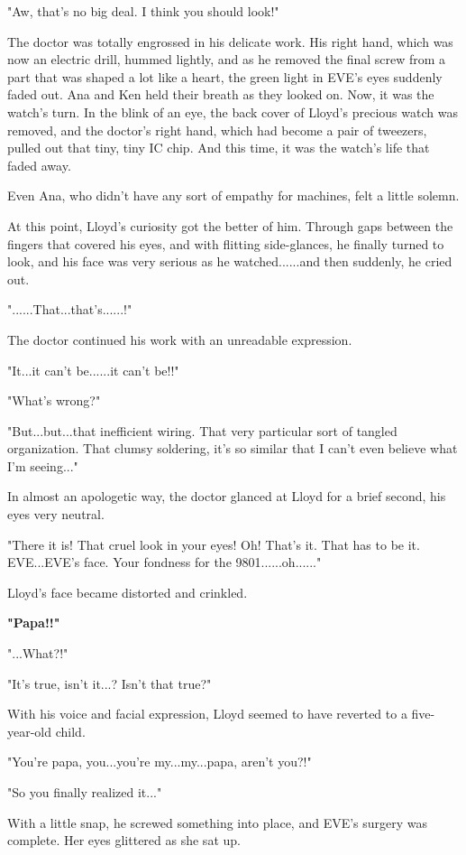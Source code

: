 \documentclass[
]{article}
\begin{document}
"Aw, that's no big deal. I think you should look!"

The doctor was totally engrossed in his delicate work. His right hand,
which was now an electric drill, hummed lightly, and as he removed the
final screw from a part that was shaped a lot like a heart, the green
light in EVE's eyes suddenly faded out. Ana and Ken held their breath as
they looked on. Now, it was the watch's turn. In the blink of an eye,
the back cover of Lloyd's precious watch was removed, and the doctor's
right hand, which had become a pair of tweezers, pulled out that tiny,
tiny IC chip. And this time, it was the watch's life that faded away.

Even Ana, who didn't have any sort of empathy for machines, felt a
little solemn.

At this point, Lloyd's curiosity got the better of him. Through gaps
between the fingers that covered his eyes, and with flitting
side-glances, he finally turned to look, and his face was very serious
as he watched......and then suddenly, he cried out.

"......That...that's......!"

The doctor continued his work with an unreadable expression.

"It...it can't be......it can't be!!"

"What's wrong?"

"But...but...that inefficient wiring. That very particular sort of
tangled organization. That clumsy soldering, it's so similar that I
can't even believe what I'm seeing..."

In almost an apologetic way, the doctor glanced at Lloyd for a brief
second, his eyes very neutral.

"There it is! That cruel look in your eyes! Oh! That's it. That has to
be it. EVE...EVE's face. Your fondness for the 9801......oh......"

Lloyd's face became distorted and crinkled.

\textbf{"Papa!!"}

"...What?!"

"It's true, isn't it...? Isn't that true?"

With his voice and facial expression, Lloyd seemed to have reverted to a
five-year-old child.

"You're papa, you...you're my...my...papa, aren't you?!"

"So you finally realized it..."

With a little snap, he screwed something into place, and EVE's surgery
was complete. Her eyes glittered as she sat up.
\end{document}
